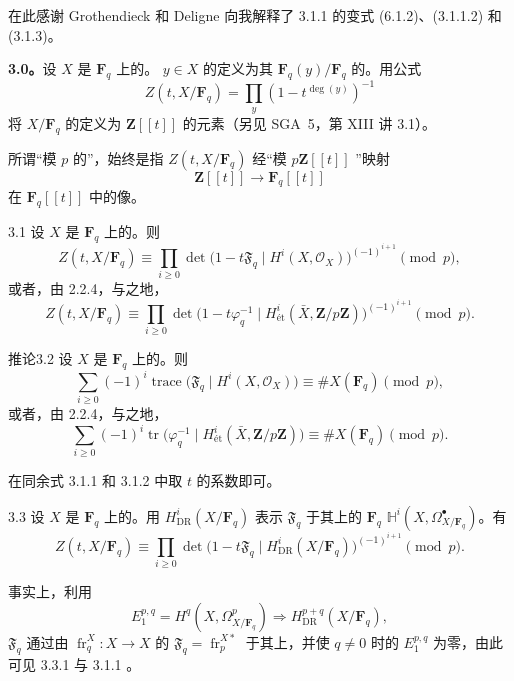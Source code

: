 在此感谢 Grothendieck 和 Deligne 向我解释了 3.1.1 的变式 (6.1.2)、(3.1.1.2) 和 (3.1.3)。

\textbf{3.0。}设 $X$ 是 $\mathbf F_q$ 上的。 $y\in X$ 的定义为其 $\mathbf F_q(y)/\mathbf F_q$ 的。用公式
\[
Z(t,X/\mathbf F_q)=\prod_y(1-t^{\deg(y)})^{-1} \tag{3.0.1}
\]
将 $X/\mathbf F_q$ 的定义为 $\mathbf Z[[t]]$ 的元素（另见 SGA~5，第 XIII 讲 3.1）。

所谓“模 $p$ 的”，始终是指 $Z(t,X/\mathbf F_q)$ 经“模 $p\mathbf Z[[t]]$ ”映射
\[
\mathbf Z[[t]]\longrightarrow\mathbf F_q[[t]]
\]
在 $\mathbf F_q[[t]]$ 中的像。
\begin{SGAresult}{}{3.1}
设 $X$ 是 $\mathbf F_q$ 上的。则
\[
Z(t,X/\mathbf F_q)\equiv
\prod_{i\geq0}\det\bigl(1-t\mathfrak F_q\mid H^i(X,\mathcal O_X)\bigr)^{(-1)^{i+1}}
\pmod p, \tag{3.1.1}
\]
或者，由 2.2.4，与之地，
\[
Z(t,X/\mathbf F_q)\equiv
\prod_{i\geq0}\det\bigl(1-t\varphi_q^{-1}\mid
H^i_{\text{ét}}(\bar X,\mathbf Z/p\mathbf Z)\bigr)^{(-1)^{i+1}}
\pmod p. \tag{3.1.2}
\]
\end{SGAresult}
\begin{SGAresult}{推论}{3.2}
设 $X$ 是 $\mathbf F_q$ 上的。则
\[
\sum_{i\geq0}(-1)^i\operatorname{trace}
\bigl(\mathfrak F_q\mid H^i(X,\mathcal O_X)\bigr)
\equiv\#X(\mathbf F_q)\pmod p, \tag{3.2.1}
\]
或者，由 2.2.4，与之地，
\[
\sum_{i\geq0}(-1)^i\operatorname{tr}
\bigl(\varphi_q^{-1}\mid H^i_{\text{ét}}(\bar X,\mathbf Z/p\mathbf Z)\bigr)
\equiv\#X(\mathbf F_q)\pmod p. \tag{3.2.2}
\]
\end{SGAresult}
在同余式 3.1.1 和 3.1.2 中取 $t$ 的系数即可。

\begin{SGAresult}{}{3.3}
设 $X$ 是 $\mathbf F_q$ 上的。用 $H^i_{\mathrm{DR}}(X/\mathbf F_q)$ 表示 $\mathfrak F_q$ 于其上的 $\mathbf F_q$  $\mathbb H^i(X,\Omega^\bullet_{X/\mathbf F_q})$。有
\[
Z(t,X/\mathbf F_q)\equiv
\prod_{i\geq0}\det\bigl(1-t\mathfrak F_q\mid
H^i_{\mathrm{DR}}(X/\mathbf F_q)\bigr)^{(-1)^{i+1}}\pmod p. \tag{3.3.1}
\]
\end{SGAresult}
事实上，利用
\[
E_1^{p,q}=H^q(X,\Omega^p_{X/\mathbf F_q})
\Longrightarrow H^{p+q}_{\mathrm{DR}}(X/\mathbf F_q), \tag{3.3.2}
\]
$\mathfrak F_q$ 通过由 $\operatorname{fr}_q^X:X\longrightarrow X$ 的
$\mathfrak F_q=\operatorname{fr}_p^{X*}$ 于其上，并使 $q\ne0$ 时的 $E_1^{p,q}$ 为零，由此可见 3.3.1 与 3.1.1 。

